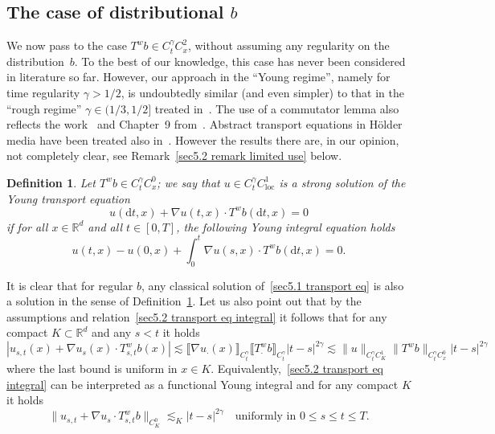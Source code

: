 \documentclass[10pt]{article}
\newcommand{\mathd}{\mathrm{d}}
\newcommand{\tmop}[1]{\ensuremath{\operatorname{#1}}}
\newtheorem{definition}{Definition}
\begin{document}
\subsection{The case of distributional $b$}

We now pass to the case $T^w b \in C^{\gamma}_t C^2_x$, without assuming any
regularity on the distribution~$b$. To the best of our knowledge, this case
has never been considered in literature so far. However, our approach in the
``Young regime'', namely for time regularity $\gamma > 1 / 2$, is undoubtedly
similar (and even simpler) to that in the ``rough regime'' $\gamma \in (1 / 3,
1 / 2]$ treated in~{\cite{bailleul}}. The use of a commutator lemma also
reflects the work~{\cite{diperna}} and Chapter~9 from~{\cite{maurelli}}.
Abstract transport equations in H\"{o}lder media have been treated also
in~{\cite{hu}}. However the results there are, in our opinion, not completely
clear, see Remark~\ref{sec5.2 remark limited use} below.

\begin{definition}
  \label{sec5.2 defn transport}Let $T^w b \in C^{\gamma}_t C^0_x$; we say that
  $u \in C^{\gamma}_t C^1_{\tmop{loc}}$ is a strong solution of the Young
  transport equation
  \begin{equation}
    u (\mathd t, x) + \nabla u (t, x) \cdot T^w b (\mathd t, x) = 0
    \label{sec5.2 transport eq}
  \end{equation}
  if for all $x \in \mathbb{R}^d$ and all $t \in [0, T]$, the following Young
  integral equation holds
  \begin{equation}
    u (t, x) - u (0, x) + \int_0^t \nabla u (s, x) \cdot T^w b (\mathd t, x) =
    0. \label{sec5.2 transport eq integral}
  \end{equation}
\end{definition}

\begin{remark}
  \label{sec5.2 remark defn transport}It is clear that for regular $b$, any
  classical solution of~{\eqref{sec5.1 transport eq}} is also a solution in
  the sense of Definition~\ref{sec5.2 defn transport}. Let us also point out
  that by the assumptions and relation~{\eqref{sec5.2 transport eq integral}}
  it follows that for any compact $K \subset \mathbb{R}^d$ and any $s < t$ it
  holds
  \[ | u_{s, t} (x) + \nabla u_s (x) \cdot T^w_{s, t} b (x) | \lesssim
     \llbracket \nabla u_{\cdot} (x) \rrbracket_{C^{\gamma}_t} \llbracket
     T^w_{\cdot} b \rrbracket_{C^{\gamma}_t} | t - s |^{2 \gamma} \lesssim \|
     u \|_{C^{\gamma}_t C^1_K} \| T^w b \|_{C^{\gamma}_t C^0_x} | t - s |^{2
     \gamma} \]
  where the last bound is uniform in $x \in K$. Equivalently,~{\eqref{sec5.2
  transport eq integral}} can be interpreted as a functional Young integral
  and for any compact $K$ it holds
  \begin{equation}
    \| u_{s, t} + \nabla u_s \cdot T^w_{s, t} b \|_{C^0_K} \lesssim_K | t - s
    |^{2 \gamma} \quad \text{uniformly in } 0 \leqslant s \leqslant t
    \leqslant T. \label{sec5.2 transport eq3}
  \end{equation}
\end{remark}
\end{document}
